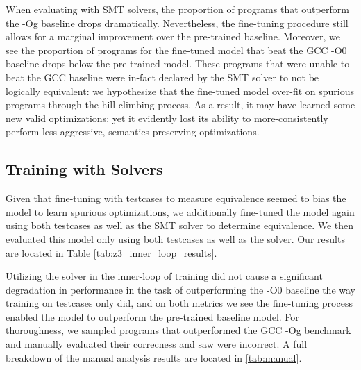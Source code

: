 \documentclass{article}
\begin{document}
When evaluating with SMT solvers, the proportion of programs that outperform the -Og baseline drops dramatically. Nevertheless, the fine-tuning procedure still allows for a marginal improvement over the pre-trained baseline. Moreover, we see the proportion of programs for the fine-tuned model that beat the GCC -O0 baseline drops below the pre-trained model. These programs that were unable to beat the GCC baseline were in-fact declared by the SMT solver to not be logically equivalent: we hypothesize that the fine-tuned model over-fit on spurious programs through the hill-climbing process. As a result, it may have learned some new valid optimizations; yet it evidently lost its ability to more-consistently perform less-aggressive, semantics-preserving optimizations. 

\subsection{Training with Solvers}

Given that fine-tuning with testcases to measure equivalence seemed to bias the model to learn spurious optimizations, we additionally fine-tuned the model again using both testcases as well as the SMT solver to determine equivalence. We then evaluated this model only using both testcases as well as the solver. Our results are located in Table \ref{tab:z3_inner_loop_results}. 

Utilizing the solver in the inner-loop of training did not cause a significant degradation in performance in the task of outperforming the -O0 baseline the way training on testcases only did, and on both metrics we see the fine-tuning process enabled the model to outperform the pre-trained baseline model. For thoroughness, we sampled  programs that outperformed the GCC -Og benchmark and manually evaluated their correcness and saw  were incorrect. A full breakdown of the manual analysis results are located in \ref{tab:manual}.


\end{document}
